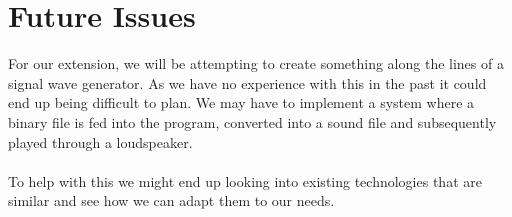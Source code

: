 \documentclass[11pt]{article}
\begin{document}
\section{Future Issues}

For our extension, we will be attempting to create something along the lines of a signal wave generator. As we have no experience with this in the past it could end up being difficult to plan. We may have to implement a system where a binary file is fed into the program, converted into a sound file and subsequently played through a loudspeaker.
\\ \\
To help with this we might end up looking into existing technologies that are similar and see how we can adapt them to our needs.
\end{document}
